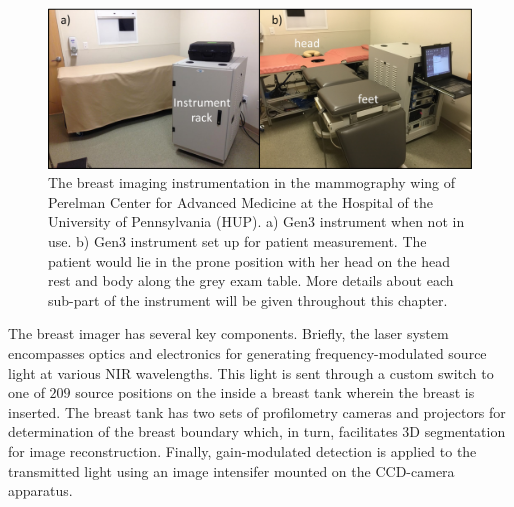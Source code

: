 %
\begin{figure}[h]
\centering
\includegraphics[width=14cm]{./figures/4_Gen3/gen3pic.png}
\caption[The breast imaging instrumentation in the mammography wing of Perelman Center for Advanced Medicine at the Hospital of the University of Pennsylvania (HUP)]{The breast imaging instrumentation in the mammography wing of Perelman Center for Advanced Medicine at the Hospital of the University of Pennsylvania (HUP). a) Gen3 instrument when not in use. b) Gen3 instrument set up for patient measurement. The patient would lie in the prone position with her head on the head rest and body along the grey exam table. More details about each sub-part of the instrument will be given throughout this chapter.}
\label{fig:gen3pic}
\end{figure}

The breast imager has several key components. Briefly, the laser system encompasses optics and electronics for generating frequency-modulated source light at various NIR wavelengths. This light is sent through a custom switch to one of $209$ source positions on the inside a breast tank wherein the breast is inserted. The breast tank has two sets of profilometry cameras and projectors for determination of the breast boundary which, in turn, facilitates 3D segmentation for image reconstruction. Finally, gain-modulated detection is applied to the transmitted light using an image intensifer mounted on the CCD-camera apparatus.

